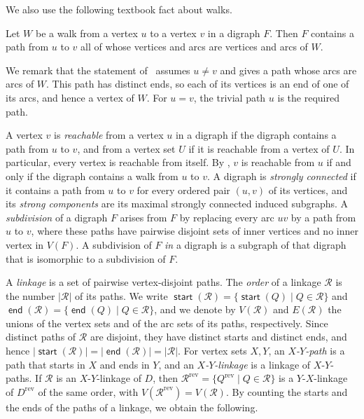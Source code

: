 \documentclass[fontsize=12pt,leading=14pt]{fullpaper}
\DeclareMathOperator{\st}{\mathsf{start}}
\DeclareMathOperator{\en}{\mathsf{end}}
\newcommand{\rev}{\mathrm{rev}}
\newcommand{\Rcal}{\mathcal{R}}
\begin{document}
We also use the following textbook fact about walks.

\begin{proposition}\label{obs:walk-path}
  Let $W$ be a walk from a vertex $u$ to a vertex $v$ in a digraph $F$.
  Then $F$ contains a path from $u$ to $v$ all of whose vertices and arcs are vertices and arcs of $W$.
\end{proposition}

We remark that the statement of~\cite[Proposition~1.4.1]{BangJensenG02} assumes $u\ne v$ and gives a path whose arcs are arcs of $W$.
This path has distinct ends, so each of its vertices is an end of one of its arcs, and hence a vertex of $W$.
For $u=v$, the trivial path $u$ is the required path.

A vertex $v$ is \emph{reachable} from a vertex $u$ in a digraph if the digraph contains a path from $u$ to $v$, and from a vertex set $U$ if it is reachable from a vertex of $U$.
In particular, every vertex is reachable from itself.
By , $v$ is reachable from $u$ if and only if the digraph contains a walk from $u$ to $v$.
A digraph is \emph{strongly connected} if it contains a path from $u$ to $v$ for every ordered pair $(u,v)$ of its vertices, and its \emph{strong components} are its maximal strongly connected induced subgraphs.
A \emph{subdivision} of a digraph $F$ arises from $F$ by replacing every arc $uv$ by a path from $u$ to $v$, where these paths have pairwise disjoint sets of inner vertices and no inner vertex in $V(F)$.
A subdivision of $F$ \emph{in} a digraph is a subgraph of that digraph that is isomorphic to a subdivision of $F$.

A \emph{linkage} is a set of pairwise vertex-disjoint paths.
The \emph{order} of a linkage $\Rcal$ is the number $|\Rcal|$ of its paths.
We write $\st(\Rcal)=\{\st(Q)\mid Q\in\Rcal\}$ and $\en(\Rcal)=\{\en(Q)\mid Q\in\Rcal\}$, and we denote by $V(\Rcal)$ and $E(\Rcal)$ the unions of the vertex sets and of the arc sets of its paths, respectively.
Since distinct paths of $\Rcal$ are disjoint, they have distinct starts and distinct ends, and hence $|\st(\Rcal)|=|\en(\Rcal)|=|\Rcal|$.
For vertex sets $X,Y$, an \emph{$X$-$Y$-path} is a path that starts in $X$ and ends in $Y$, and an \emph{$X$-$Y$-linkage} is a linkage of $X$-$Y$-paths.
If $\Rcal$ is an $X$-$Y$-linkage of $D$, then $\Rcal^\rev=\{Q^\rev\mid Q\in\Rcal\}$ is a $Y$-$X$-linkage of $D^\rev$ of the same order, with $V(\Rcal^\rev)=V(\Rcal)$.
By counting the starts and the ends of the paths of a linkage, we obtain the following.
\end{document}
